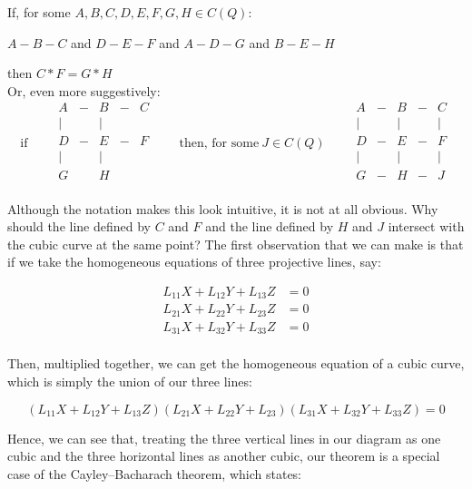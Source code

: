 \documentclass{article}
\begin{document}
If, for some $A, B, C, D, E, F, G, H \in C(Q)$: 

$A - B - C$ and $D - E - F$ and $A - D - G$ and $B - E - H$

then $C * F = G * H$\\

Or, even more suggestively:
\[
\text{if} \qquad
\begin{matrix}
A & - & B & - & C\\
| &   & | & \\
D & - & E & - & F\\
| &   & | &\\
G &   & H &\\
\end{matrix}
\qquad \text{then, for some} \ J \in C(Q) \qquad
\begin{matrix}
A & - & B & - & C\\
| &   & | &   & |\\
D & - & E & - & F\\
| &   & | &   & |\\
G & - & H & - & J\\
\end{matrix}
\]

Although the notation makes this look intuitive, it is not at all obvious. Why should the line defined by $C$ and $F$ and the line defined by $H$ and $J$ intersect with the cubic curve at the same point? The first observation that we can make is that if we take the homogeneous equations of three projective lines, say:

\begin{align*}
    L_{11} X + L_{12} Y + L_{13} Z &= 0 \\
    L_{21} X + L_{22} Y + L_{23} Z &= 0 \\
    L_{31} X + L_{32} Y + L_{33} Z &= 0 \\
\end{align*}

Then, multiplied together, we can get the homogeneous equation of a cubic curve, which is simply the union of our three lines:

\[(L_{11} X + L_{12} Y + L_{13} Z)(L_{21} X + L_{22} Y + L_{23})(L_{31} X + L_{32} Y + L_{33} Z) = 0\]

Hence, we can see that, treating the three vertical lines in our diagram as one cubic and the three horizontal lines as another cubic, our theorem is a special case of the Cayley–Bacharach theorem, which states:\\
\end{document}
